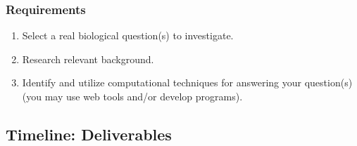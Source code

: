 \subsubsection*{Requirements}
\begin{enumerate}
	\item Select a real biological question(s) to investigate.
	\item Research relevant background.
	\item Identify and utilize computational techniques for answering your question(s) (you may use web tools and/or develop programs).
\end{enumerate}

\subsection*{Timeline: Deliverables}
